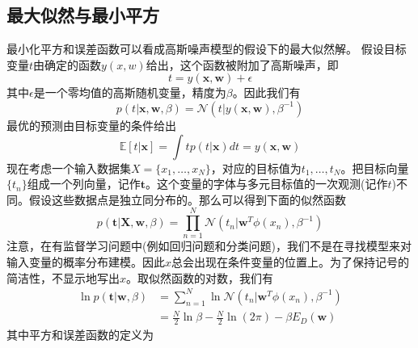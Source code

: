\subsection*{最大似然与最小平方}
最小化平方和误差函数可以看成高斯噪声模型的假设下的最大似然解。
假设目标变量$t$由确定的函数$y(x,w)$给出，这个函数被附加了高斯噪声，即
\begin{equation}
	t=y(\boldsymbol{x},\boldsymbol{w})+\epsilon
\end{equation}
其中$\epsilon$是一个零均值的高斯随机变量，精度为$\beta$。因此我们有 
\begin{equation}
\label{38}
	p(t|\boldsymbol{x},\boldsymbol{w},\beta)=\mathcal{N}(t|y(\boldsymbol{x},\boldsymbol{w}),\beta^{-1})
\end{equation}
最优的预测由目标变量的条件给出
\begin{equation}
	\mathbb{E}[t|\boldsymbol{x}]=\int tp(t|\boldsymbol{x})dt = y(\boldsymbol{x},\boldsymbol{w})
\end{equation}
现在考虑一个输入数据集$X=\{x_1,\dots,x_N \}$，对应的目标值为$t_1,\dots,t_N$。把目标向量$\{t_n\}$组成一个列向量，记作$\textbf{t}$。这个变量的字体与多元目标值的一次观测(记作$t$)不同。假设这些数据点是独立同分布的。那么可以得到下面的似然函数
\begin{equation}
	p(\boldsymbol{t}|\boldsymbol{X},\boldsymbol{w},\beta)=\prod_{n=1}^{N}\mathcal{N}(t_n|\boldsymbol{w}^T\phi(x_n),\beta^{-1})
\end{equation}
注意，在有监督学习问题中(例如回归问题和分类问题)，我们不是在寻找模型来对输入变量的概率分布建模。因此$x$总会出现在条件变量的位置上。为了保持记号的简洁性，不显示地写出$x$。取似然函数的对数，我们有
\begin{equation}
\label{311}
	\begin{aligned}
	\ln p(\boldsymbol{t}|\boldsymbol{w},\beta)&=\sum_{n=1}^{N}\ln \mathcal{N}(t_n|\boldsymbol{w}^T\phi(x_n),\beta^{-1})\\
	&=\frac{N}{2}\ln \beta -\frac{N}{2}\ln (2\pi) -\beta E_D(\boldsymbol{w})
	\end{aligned}
\end{equation}
其中平方和误差函数的定义为
